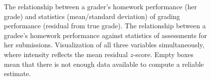 \begin{figure}
\begin{center}
\;\;
\;\;
\end{center}
\caption{%
 The relationship between a grader's homework performance (her grade)
and statistics (mean/standard deviation) of grading performance (residual from true grade).
 The relationship between a gradee's homework performance against statistics of assessments
for her submissions.
 Visualization of all three variables simultaneously, where intensity reflects
the mean residual $z$-score.  Empty boxes mean that there is not enough data available to compute a reliable estimate.
}
\label{fig:graders}
\end{figure}


